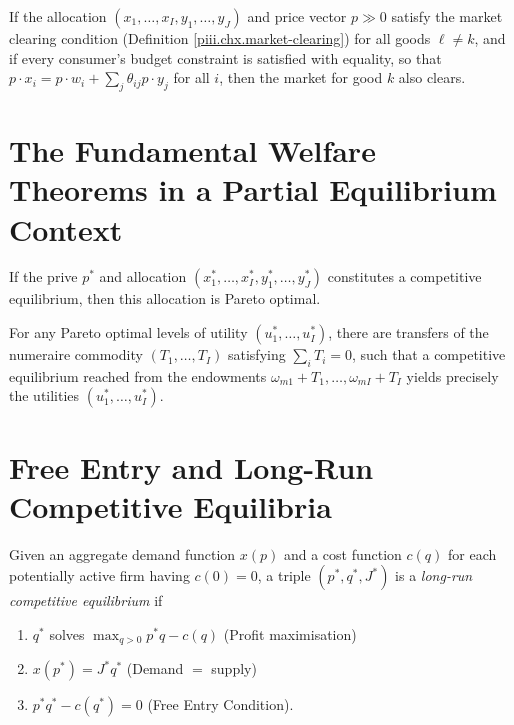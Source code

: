 \begin{lem}
    If the allocation $(x_1, \dots, x_I, y_1, \dots, y_J)$ and price vector $p \gg 0$ satisfy the market clearing condition (Definition \ref{piii.chx.market-clearing}) for all goods $\ell \neq k$, and if every consumer's budget constraint is satisfied with equality, so that $p \cdot x_i = p \cdot w_i + \sum_j \theta_{ij} p \cdot y_j$ for all $i$, then the market for good $k$ also clears.
\end{lem}


\addtocounter{section}{1}


\section{The Fundamental Welfare Theorems in a Partial Equilibrium Context}

\begin{prop}
    If the prive $p^*$ and allocation $(x^*_1, \dots, x^*_I, y^*_1, \dots, y^*_J)$ constitutes a competitive equilibrium, then this allocation is Pareto optimal.
\end{prop}

\begin{prop}
    For any Pareto optimal levels of utility $(u^*_1, \dots, u^*_I)$, there are transfers of the numeraire commodity $(T_1, \dots, T_I)$ satisfying $\sum_i T_i = 0$, such that a competitive equilibrium reached from the endowments $\omega_{m1} + T_1, \dots, \omega_{mI} + T_I$ yields precisely the utilities $(u^*_1, \dots, u^*_I)$.
\end{prop}


\addtocounter{section}{1}


\section{Free Entry and Long-Run Competitive Equilibria}

\begin{defn}
    Given an aggregate demand function $x(p)$ and a cost function $c(q)$ for each potentially active firm having $c(0) = 0$, a triple $(p^*, q^*, J^*)$ is a \emph{long-run competitive equilibrium} if
    \begin{enumerate}
        \item $q^*$ solves $\max_{q > 0} p^* q - c(q)$ (Profit maximisation)
        \item $x(p^*) = J^* q^*$ (Demand $=$ supply)
        \item $p^* q^* - c(q^*) = 0$ (Free Entry Condition).
    \end{enumerate} 
\end{defn}